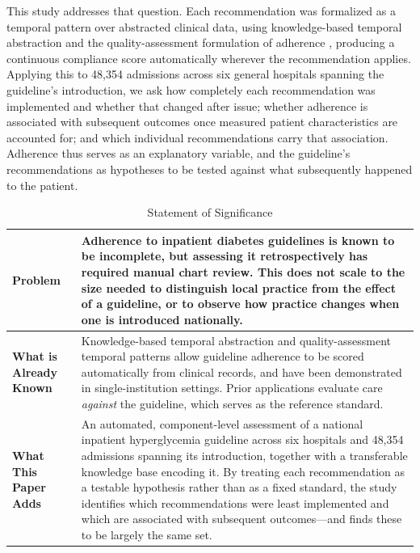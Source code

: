 This study addresses that question. Each recommendation was formalized as a
temporal pattern over abstracted clinical data, using knowledge-based
temporal abstraction \citep{shahar1997framework} and the quality-assessment
formulation of adherence \citep{ben2024supporting}, producing a continuous
compliance score automatically wherever the recommendation applies. Applying
this to 48,354 admissions across six general hospitals spanning the
guideline's introduction, we ask how completely each recommendation was
implemented and whether that changed after issue; whether adherence is
associated with subsequent outcomes once measured patient characteristics
are accounted for; and which individual recommendations carry that
association. Adherence thus serves as an explanatory variable, and the
guideline's recommendations as hypotheses to be tested against what
subsequently happened to the patient.

\begin{table}[h]
\centering
\caption{Statement of Significance}
\label{tab:significance}
\begin{tabularx}{\textwidth}{
>{\raggedright\arraybackslash}p{}
>{\raggedright\arraybackslash}X
}
\toprule

\textbf{Problem} &
Adherence to inpatient diabetes guidelines is known to be incomplete, but
assessing it retrospectively has required manual chart review. This does not
scale to the size needed to distinguish local practice from the effect of a
guideline, or to observe how practice changes when one is introduced
nationally. \\

\midrule

\textbf{What is Already Known} &
Knowledge-based temporal abstraction and quality-assessment temporal
patterns allow guideline adherence to be scored automatically from clinical
records, and have been demonstrated in single-institution settings. Prior
applications evaluate care \emph{against} the guideline, which serves as the
reference standard. \\

\midrule

\textbf{What This Paper Adds} &
An automated, component-level assessment of a national inpatient
hyperglycemia guideline across six hospitals and 48,354 admissions spanning
its introduction, together with a transferable knowledge base encoding it.
By treating each recommendation as a testable hypothesis rather than as a
fixed standard, the study identifies which recommendations were least
implemented and which are associated with subsequent outcomes---and finds
these to be largely the same set. \\

\bottomrule
\end{tabularx}
\end{table}
